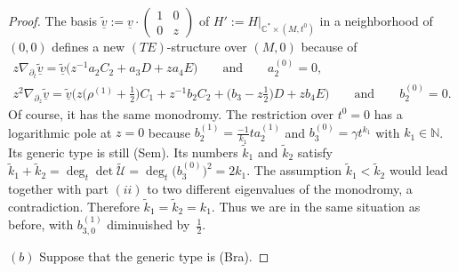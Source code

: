 \documentclass[pdftex]{sigma}%
\numberwithin{equation}{section}
\numberwithin{figure}{section}
\newcommand{\N}{{\mathbb N}}
\newcommand{\C}{{\mathbb C}}
\newcommand{\UU}{{\mathcal U}}
\newcommand{\www}{\widetilde}
\newcommand{\uuuu}{\underline}
\newcommand{\paa}{\partial}
\newcommand{\nnn}{\nabla}
\begin{document}
\begin{proof}
The basis $\uuuu{\www v}:= \uuuu{v}\cdot
\left(\begin{smallmatrix}1&0\\0&z\end{smallmatrix}\right)$ of
$H':=H|_{\C^*\times (M,t^0)}$ in a neighborhood of $(0,0)$
defines a new $(TE)$-structure over $(M,0)$ because of
\begin{gather*}%
z\nnn_{\paa_t}\uuuu{\www v}= \uuuu{\www v}
\bigl(z^{-1}a_2C_2+a_3D+za_4E\bigr)\qquad\text{and}\qquad a_2^{(0)}=0,
\\[1ex]
z^2\nnn_{\paa_z}\uuuu{\www v}= \uuuu{\www v}
\bigg(z\bigg(\rho^{(1)}+\frac{1}{2}\bigg)C_1+z^{-1}b_2C_2+\bigg(b_3-z\frac{1}{2}\bigg)D
+zb_4E\bigg)\qquad \text{and}\qquad b_2^{(0)}=0.
\end{gather*}
Of course, it has the same monodromy.
The restriction over $t^0=0$ has a logarithmic pole at $z=0$
because $b_2^{(1)}=\frac{-1}{k_1}ta_2^{(1)}$
and $b_3^{(0)}=\gamma t^{k_1}$ with $k_1\in\N$.
Its generic type is still (Sem).
Its numbers $\www k_1$ and $\www k_2$ satisfy
$\www k_1+\www k_2=\deg_t\det\www\UU=\deg_t\big(b_3^{(0)}\big)^2=2k_1$.
The assumption $\www k_1<\www k_2$ would lead together with
part $(ii)$ to two different eigenvalues of the monodromy,
a contradiction. Therefore $\www k_1=\www k_2=k_1$.
Thus we are in the same situation as before, with
$b_{3,0}^{(1)}$ diminuished by~$\frac{1}{2}$.


\medskip
$(b)$ Suppose that the generic type is (Bra).


\end{proof}
\end{document}
